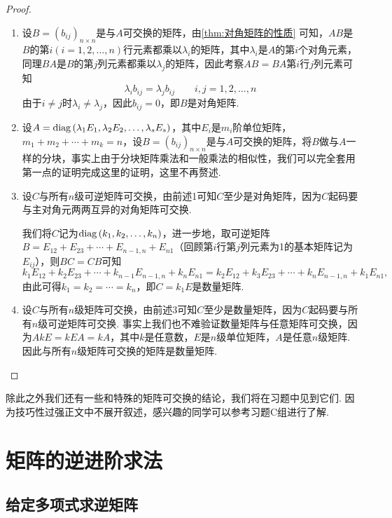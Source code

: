 \begin{proof}
    \begin{enumerate}
        \item 设$B=(b_{ij})_{n\times n}$是与$A$可交换的矩阵，由\autoref{thm:对角矩阵的性质} 可知，$AB$是$B$的第$i(i=1,2,\ldots,n)$行元素都乘以$\lambda_i$的矩阵，其中$\lambda_i$是$A$的第$i$个对角元素，同理$BA$是$B$的第$j$列元素都乘以$\lambda_j$的矩阵，因此考察$AB=BA$第$i$行$j$列元素可知
              \[\lambda_ib_{ij}=\lambda_jb_{ij}\qquad i,j=1,2,\ldots,n\]
              由于$i\neq j$时$\lambda_i\neq\lambda_j$，因此$b_{ij}=0$，即$B$是对角矩阵.

        \item 设$A=\operatorname{diag}{(\lambda_1E_1,\lambda_2E_2,\ldots,\lambda_sE_s)}$，其中$E_i$是$m_i$阶单位矩阵，$m_1+m_2+\cdots+m_k=n$，设$B=(b_{ij})_{n\times n}$是与$A$可交换的矩阵，将$B$做与$A$一样的分块，事实上由于分块矩阵乘法和一般乘法的相似性，我们可以完全套用第一点的证明完成这里的证明，这里不再赘述.

        \item 设$C$与所有$n$级可逆矩阵可交换，由前述1可知$C$至少是对角矩阵，因为$C$起码要与主对角元两两互异的对角矩阵可交换.

              我们将$C$记为$\operatorname{diag}{(k_1,k_2,\ldots,k_n)}$，进一步地，取可逆矩阵$B=E_{12}+E_{23}+\cdots+E_{n-1,n}+E_{n1}$（回顾第$i$行第$j$列元素为1的基本矩阵记为$E_{ij}$），则$BC=CB$可知
              \[k_1E_{12}+k_2E_{23}+\cdots+k_{n-1}E_{n-1,n}+k_nE_{n1}=k_2E_{12}+k_3E_{23}+\cdots+k_nE_{n-1,n}+k_1E_{n1},\]
              由此可得$k_1=k_2=\cdots=k_n$，即$C=k_1E$是数量矩阵.

        \item 设$C$与所有$n$级矩阵可交换，由前述3可知$C$至少是数量矩阵，因为$C$起码要与所有$n$级可逆矩阵可交换. 事实上我们也不难验证数量矩阵与任意矩阵可交换，因为$AkE=kEA=kA$，其中$k$是任意数，$E$是$n$级单位矩阵，$A$是任意$n$级矩阵. 因此与所有$n$级矩阵可交换的矩阵是数量矩阵.
    \end{enumerate}
\end{proof}

除此之外我们还有一些和特殊的矩阵可交换的结论，我们将在习题中见到它们. 因为技巧性过强正文中不展开叙述，感兴趣的同学可以参考习题C组进行了解.

\section{矩阵的逆进阶求法}

\subsection{给定多项式求逆矩阵}

